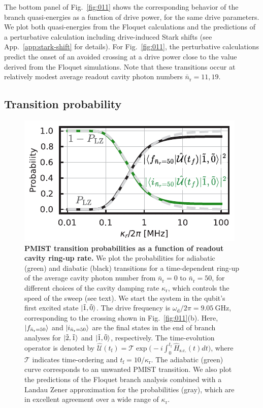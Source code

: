 \documentclass[%
reprint,
superscriptaddress,
 amsmath,amssymb,
 aps,
 prx,
longbibliography,
floatfix,
]{revtex4-2}
\begin{document}
The bottom panel of Fig.~\ref{fig:011} shows the corresponding behavior of the branch quasi-energies as a function of drive power, for the same drive parameters. We plot both quasi-energies from the Floquet calculations and the predictions of a perturbative calculation including drive-induced Stark shifts (see App.~\ref{app:stark-shift} for details). For Fig.~\ref{fig:011}, the perturbative calculations predict the onset of an avoided crossing at a drive power close to the value derived from the Floquet simulations. Note that these transitions occur at relatively modest average readout cavity photon numbers $\bar n_\textrm{r}=11,19$.

\subsection{Transition probability}\label{sec:LZ}
\begin{figure}[t]
    \centering
    \includegraphics[width=\linewidth]{Figures/LZ.pdf}
    \caption{
        {\bf PMIST transition probabilities as a function of readout cavity ring-up rate.}
        We plot the probabilities for adiabatic (green) and diabatic (black) transitions for a time-dependent ring-up of the average cavity photon number from $\bar{n}_\textrm{r} = 0$ to $\bar{n}_\textrm{r} = 50$, for different choices of the cavity damping rate $\kappa_\textrm{r}$, which controls the speed of the sweep (see text). We start the system in the qubit's first excited state $\ket{\tilde{1},\tilde{0}}$. The drive frequency is $\omega_\textrm{d}/2\pi=9.05 \ \mathrm{GHz}$, corresponding to the crossing shown in Fig.~\ref{fig:011}(b). Here, $\ket{f_{\bar n_\textrm{r}=50}}$ and $\ket{i_{\bar n_\textrm{r}=50}}$ are the final states in the end of branch analyses for $\ket{\tilde{2},\tilde{1}}$ and $\ket{\tilde{1},\tilde{0}}$, respectively. The time-evolution operator is denoted by $\hat{\mathcal{U}}(t_\textrm{f})=\mathcal{T}\exp\big(-i\int^{t_\textrm{f}}_{0} \hat H_\textrm{s.c.}(t)dt\big)$, where $\mathcal{T}$ indicates time-ordering and $t_\textrm{f}=10/\kappa_\textrm{r}$. The adiabatic (green) curve corresponds to an unwanted PMIST transition. We also plot the predictions of the Floquet branch analysis combined with a Landau Zener approximation for the probabilities (gray), which are in excellent agreement over a wide range of $\kappa_\textrm{r}$.}
    \label{fig:LZ}
\end{figure}
\end{document}
